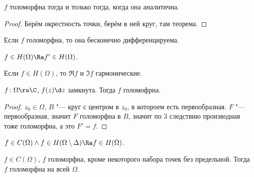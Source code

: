 \begin{conseq}
	$f$ толоморфна тогда и только тогда, когда она аналитична.
\end{conseq}
\begin{proof}
	Берём окрестность точки, берём в ней круг, там теорема.
\end{proof}

\begin{conseq}
	Если $f$ голоморфна, то она бесконечно дифференцируема.
\end{conseq}

\begin{conseq}
	$f \in H(\Omega) \Ra f' \in H(\Omega)$.
\end{conseq}

\begin{conseq}
	Если $f \in H(\Omega)$, то $\Re f$ и $\Im f$ гармонические.
\end{conseq}

\begin{theorem}[Морера]
	$f\colon \Omega \ra \C$, $f(z) \d z$ замкнута.
	Тогда $f$ голомофрна.
\end{theorem}
\begin{proof}
	$z_0 \in \Omega$, $B$ "--- круг с центром в $z_0$, в котороем есть первообразная.
	$F$ "--- первообразная, значит $F$ голоморфна в $B$, значит по 3 следствию производная тоже голоморфна, а это $F' = f$.
\end{proof}

\begin{conseq}
	$f \in C(\Omega) \land f \in H(\Omega \setminus \Delta) \Ra f \in H(\Omega)$.
\end{conseq}

\begin{conseq}
	$f \in C(\Omega)$, $f$ голоморфна, кроме некоторого набора точек без предельной.
	Тогда $f$ голоморфна на всей $\Omega$.
\end{conseq}

